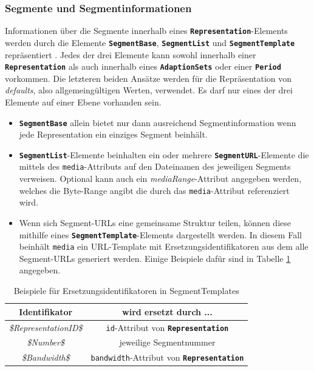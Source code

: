 \documentclass[paper = a4, fontsize = 12pt, parskip = half]{scrartcl} %
\def\attr#1{\texttt{#1}}
\def\elem#1{\texttt{\textbf{#1}}}
\begin{document}
\subsubsection{Segmente und Segmentinformationen}
Informationen über die Segmente innerhalb eines \elem{Representation}-Elements werden durch die Elemente \elem{SegmentBase}, \elem{SegmentList} und \elem{SegmentTemplate} repräsentiert \cite{international_organization_for_standardization_isoiec_nodate}. Jedes der drei Elemente kann sowohl innerhalb einer \elem{Representation} als auch innerhalb eines \elem{AdaptionSets} oder einer \elem{Period} vorkommen. Die letzteren beiden Ansätze werden für die Repräsentation von \textit{defaults}, also allgemeingültigen Werten, verwendet. Es darf nur eines der drei Elemente auf einer Ebene vorhanden sein.

\begin{itemize}
	\item \elem{SegmentBase} allein bietet nur dann ausreichend Segmentinformation wenn jede Representation ein einziges Segment beinhält.
	\item \elem{SegmentList}-Elemente beinhalten ein oder mehrere \elem{SegmentURL}-Elemente die mittels des \attr{media}-Attributs auf den Dateinamen des jeweiligen Segments verweisen. Optional kann auch ein \textit{mediaRange}-Attribut angegeben werden, welches die Byte-Range angibt die durch das \attr{media}-Attribut referenziert wird.
	\item Wenn sich Segment-URLs eine gemeinsame Struktur teilen, können diese mithilfe eines \elem{SegmentTemplate}-Elements dargestellt werden. In diesem Fall beinhält \attr{media} ein URL-Template mit Ersetzungsidentifikatoren aus dem alle Segment-URLs generiert werden. Einige Beispiele dafür sind in Tabelle \ref{template_substitutions} angegeben. 
\end{itemize}

\begin{center}
	\begin{table}[ht]
        \centering
		\begin{tabular}{| c | c |}
			\hline
			\textbf{Identifikator}        & \textbf{wird ersetzt durch ...}                     \\
			\hline
			\hline
			\textit{\$RepresentationID\$} & \attr{id}-Attribut von \elem{Representation}        \\
			\hline
			\textit{\$Number\$}           & jeweilige Segmentnummer                             \\
			\hline
			\textit{\$Bandwidth\$}        & \attr{bandwidth}-Attribut von \elem{Representation} \\
			\hline
		\end{tabular}
        \caption{Beispiele für Ersetzungsidentifikatoren in SegmentTemplates}
		\label{template_substitutions}
	\end{table}
\end{center}
\end{document}
